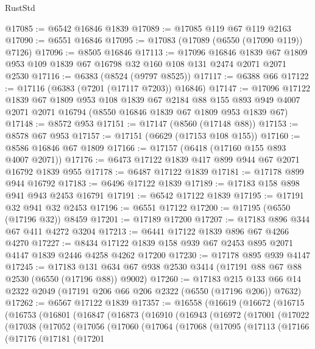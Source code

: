 \begin{lexlean}{RustStd}
\begin{coremodule}
@17085 := @6542 @16846 @1839
@17089 := @17085 @119 @67 @119 @2163
@17090 := @6551 @16846
@17095 := @17083 (@17089 (@6550 (@17090 @119)) @7126)
@17096 := @8505 @16846
@17113 := @17096
    @16846
    @1839
    @67
    @1809
    @953
    @109
    @1839
    @67
    @16798
    @32
    @160
    @108
    @131
    @2474
    @2071
    @2071
    @2530
@17116 := @6383 (@8524 (@9797 @8525))
@17117 := @6388 @66
@17122 := @17116 (@6383 (@7201 (@17117 @7203)) @16846)
@17147 := @17096
    @17122
    @1839
    @67
    @1809
    @953
    @108
    @1839
    @67
    @2184
    @88
    @155
    @893
    @949
    @4007
    @2071
    @2071
    @16794
    (@8550 @16846 @1839 @67 @1809 @953 @1839 @67)
@17148 := @8572 @953
@17151 := @17147 (@8560 (@17148 @88))
@17153 := @8578 @67 @953
@17157 := @17151 (@6629 (@17153 @108 @155))
@17160 := @8586 @16846 @67 @1809
@17166 := @17157 (@6418 (@17160 @155 @893 @4007 @2071))
@17176 := @6473 @17122 @1839 @417 @899 @944 @67 @2071 @16792 @1839 @955
@17178 := @6487 @17122 @1839
@17181 := @17178 @899 @944 @16792
@17183 := @6496 @17122 @1839
@17189 := @17183 @158 @898 @941 @943 @2453 @16791
@17191 := @6542 @17122 @1839
@17195 := @17191 @32 @941 @32 @2453
@17196 := @6551 @17122
@17200 := @17195 (@6550 (@17196 @32)) @8459
@17201 := @17189 @17200
@17207 := @17183 @896 @344 @67 @411 @4272 @3204
@17213 := @6441 @17122 @1839 @896 @67 @4266 @4270
@17227 := @8434 @17122 @1839 @158 @939 @67 @2453 @895 @2071 @4147 @1839 @2446 @4258 @4262 @17200
@17230 := @17178 @895 @939 @4147
@17245 := @17183
    @131
    @634
    @67
    @938
    @2530
    @3414
    (@17191 @88 @67 @88 @2530 (@6550 (@17196 @88)) @9002)
@17260 := @17183
    @215
    @133
    @66
    @14
    @2322
    @2049
    (@17191 @206 @66 @206 @2322 (@6550 (@17196 @206)) @7632)
@17262 := @6567 @17122 @1839
@17357 := @16558
    (@16619
      (@16672
        (@16715
          (@16753
            (@16801
              (@16847
                (@16873
                  (@16910
                    (@16943
                      (@16972
                        (@17001
                          (@17022
                            (@17038
                              (@17052
                                (@17056
                                  (@17060
                                    (@17064
                                      (@17068
                                        (@17095
                                          (@17113
                                            (@17166
                                              (@17176
                                                (@17181
                                                  (@17201

\end{coremodule}
\end{lexlean}
